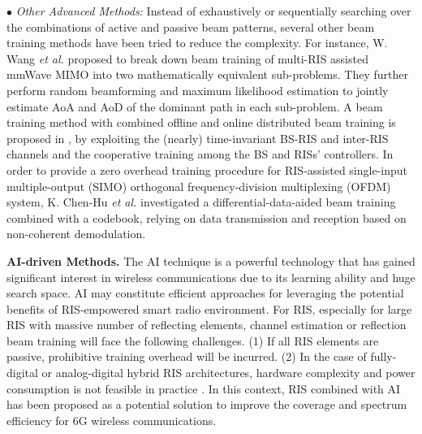 \documentclass[journal,comsoc]{IEEEtran}
\begin{document}
$\bullet$ \emph{Other Advanced Methods:} Instead of exhaustively or sequentially searching over the combinations of active and passive beam patterns, several other beam training methods have been tried to reduce the complexity. For instance, W. Wang \emph{et al.} \cite{Joint-Beam-Training-Positioning-RIS-2021} proposed to break down beam training of multi-RIS assisted mmWave MIMO into two mathematically equivalent sub-problems. They further perform random beamforming and maximum likelihood estimation to jointly estimate AoA and AoD of the dominant path in each sub-problem. A beam training method with combined offline and online distributed beam training is proposed in \cite{Distributed-Beam-Training-2021}, by exploiting the (nearly) time-invariant BS-RIS and inter-RIS channels and the cooperative training among the BS and RISs' controllers. In order to provide a zero overhead training procedure for RIS-assisted single-input multiple-output (SIMO) orthogonal frequency-division multiplexing (OFDM) system, K. Chen-Hu \emph{et al.} \cite{Differential-Data-Aided-Beam-Training} investigated a differential-data-aided beam training combined with a codebook, relying on data transmission and reception based on non-coherent demodulation.



{\bf{AI-driven Methods.}} The AI technique is a powerful technology that has gained significant interest in wireless communications due to its learning ability and huge search space. AI may constitute efficient approaches for leveraging the potential benefits of RIS-empowered smart radio environment. For RIS, especially for large RIS with massive number of reflecting elements, channel estimation or reflection beam training will face the following challenges. (1) If all RIS elements are passive, prohibitive training overhead will be incurred. (2) In the case of fully-digital or analog-digital hybrid RIS architectures, hardware complexity and power consumption is not feasible in practice \cite{Enabling-Large-RIS-DL-2021}. In this context, RIS combined with AI has been proposed as a potential solution to improve the coverage and spectrum efficiency for 6G wireless communications.
\end{document}
